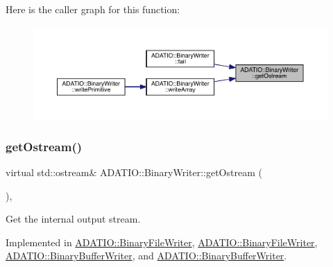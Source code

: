 Here is the caller graph for this function\+:\nopagebreak
\begin{figure}[H]
\begin{center}
\leavevmode
\includegraphics[width=350pt]{db/dee/classADATIO_1_1BinaryWriter_a4fe227341d17d012bb83a070c208dac0_icgraph}
\end{center}
\end{figure}
\mbox{\label{classADATIO_1_1BinaryWriter_a4fe227341d17d012bb83a070c208dac0}} 
\subsubsection{\texorpdfstring{getOstream()}{getOstream()}\hspace{0.1cm}{\footnotesize\ttfamily [2/2]}}
{\footnotesize\ttfamily virtual std\+::ostream\& A\+D\+A\+T\+I\+O\+::\+Binary\+Writer\+::get\+Ostream (\begin{DoxyParamCaption}{ }\end{DoxyParamCaption})\hspace{0.3cm}{\ttfamily [protected]}, {}}



Get the internal output stream. 



Implemented in \mbox{\hyperlink{classADATIO_1_1BinaryFileWriter_a2506200a774d4823088a0365e0452d9a}{A\+D\+A\+T\+I\+O\+::\+Binary\+File\+Writer}}, \mbox{\hyperlink{classADATIO_1_1BinaryFileWriter_a2506200a774d4823088a0365e0452d9a}{A\+D\+A\+T\+I\+O\+::\+Binary\+File\+Writer}}, \mbox{\hyperlink{classADATIO_1_1BinaryBufferWriter_a587ce48f0cf6dd4064edde6db836c0a3}{A\+D\+A\+T\+I\+O\+::\+Binary\+Buffer\+Writer}}, and \mbox{\hyperlink{classADATIO_1_1BinaryBufferWriter_a587ce48f0cf6dd4064edde6db836c0a3}{A\+D\+A\+T\+I\+O\+::\+Binary\+Buffer\+Writer}}.

\mbox{\label{classADATIO_1_1BinaryWriter_ae64230370824192d1f0dbcaa8e74017a}} 
